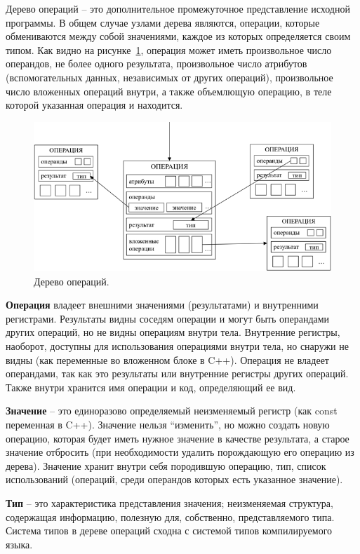 Дерево операций -- это дополнительное промежуточное представление исходной программы.
В общем случае узлами дерева являются, операции, которые обмениваются между собой значениями, каждое из которых определяется своим типом.
Как видно на рисунке~\ref{fig:optree_scheme}, операция может иметь произвольное число операндов, не более одного результата, произвольное число атрибутов (вспомогательных данных, независимых от других операций), произвольное число вложенных операций внутри, а также объемлющую операцию, в теле которой указанная операция и находится.

\begin{figure}[h]
    \centering
    \includegraphics[width=\textwidth]{images/optree-scheme.png}
    \caption{Дерево операций.}
    \label{fig:optree_scheme}
\end{figure}

\textbf{Операция} владеет внешними значениями (результатами) и внутренними регистрами.
Результаты видны соседям операции и могут быть операндами других операций, но не видны операциям внутри тела.
Внутренние регистры, наоборот, доступны для использования операциями внутри тела, но снаружи не видны (как переменные во вложенном блоке в C++).
Операция не владеет операндами, так как это результаты или внутренние регистры других операций.
Также внутри хранится имя операции и код, определяющий ее вид.

\textbf{Значение} -- это единоразово определяемый неизменяемый регистр (как const переменная в C++).
Значение нельзя “изменить”, но можно создать новую операцию, которая будет иметь нужное значение в качестве результата, а старое значение отбросить (при необходимости удалить порождающую его операцию из дерева).
Значение хранит внутри себя породившую операцию, тип, список использований (операций, среди операндов которых есть указанное значение).

\textbf{Тип} -- это характеристика представления значения; неизменяемая структура, содержащая информацию, полезную для, собственно, представляемого типа.
Система типов в дереве операций сходна с системой типов компилируемого языка.

